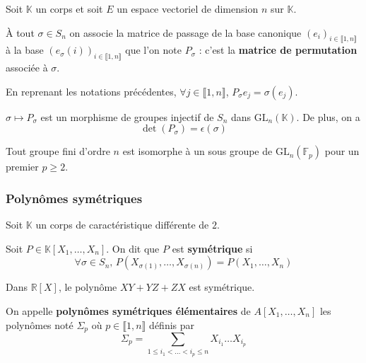 
	Soit $\mathbb{K}$ un corps et soit $E$ un espace vectoriel de dimension $n$ sur $\mathbb{K}$.

	\begin{definition}
		À tout $\sigma \in S_n$ on associe la matrice de passage de la base canonique $(e_i)_{i \in \llbracket 1, n \rrbracket}$ à la base $(e_\sigma(i))_{i \in \llbracket 1, n \rrbracket}$ que l'on note $P_{\sigma}$ : c'est la \textbf{matrice de permutation} associée à $\sigma$.
	\end{definition}

	\begin{remark}
		En reprenant les notations précédentes, $\forall j \in \llbracket 1, n \rrbracket$, $P_{\sigma} e_j = \sigma(e_j)$.
	\end{remark}

	\begin{proposition}
		$\sigma \mapsto P_{\sigma}$ est un morphisme de groupes injectif de $S_n$ dans $\mathrm{GL}_n(\mathbb{K})$. De plus, on a
		\[ \det(P_{\sigma}) = \epsilon(\sigma) \]
	\end{proposition}

	\begin{corollary}
		Tout groupe fini d'ordre $n$ est isomorphe à un sous groupe de $\mathrm{GL}_n(\mathbb{F}_p)$ pour un premier $p \geq 2$.
	\end{corollary}

	\subsubsection{Polynômes symétriques}


	Soit $\mathbb{K}$ un corps de caractéristique différente de $2$.

	\begin{definition}
		Soit $P \in \mathbb{K}[X_1, \dots, X_n]$. On dit que $P$ est \textbf{symétrique} si
		\[ \forall \sigma \in S_n, \, P(X_{\sigma(1)}, \dots, X_{\sigma(n)}) = P(X_1, \dots, X_n) \]
	\end{definition}

	\begin{example}
		Dans $\mathbb{R}[X]$, le polynôme $XY + YZ + ZX$ est symétrique.
	\end{example}

	\begin{definition}
		On appelle \textbf{polynômes symétriques élémentaires} de $A[X_1, \dots, X_n]$ les polynômes noté $\Sigma_p$ où $p \in \llbracket 1, n \rrbracket$ définis par
		\[ \Sigma_p = \sum_{1 \leq i_1 < \dots < i_p \leq n} X_{i_1} \dots X_{i_p} \]
	\end{definition}

